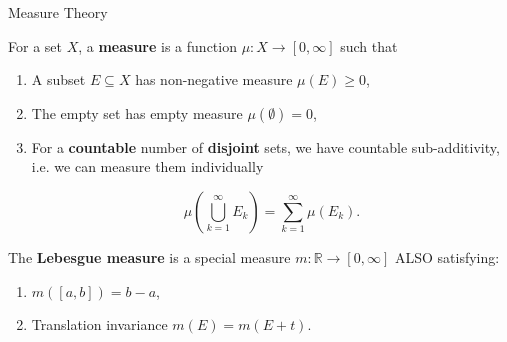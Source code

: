 \documentclass[9pt]{beamer}
\begin{document}
    \begin{frame}{Measure Theory}

        For a set $X$, a \textbf{measure} is a function $\mu:X\rightarrow[0, \infty]$ such that\pause

        \begin{enumerate}
            \item A subset $E\subseteq X$ has non-negative measure $\mu(E)\geq0$,\pause
            \item The empty set has empty measure $\mu(\emptyset)=0$,\pause
            \item For a \textbf{countable} number of \textbf{disjoint} sets, we have countable sub-additivity, i.e. we can measure them individually

            \[\mu\left(\bigcup_{k=1}^\infty E_k\right)=\sum_{k=1}^\infty \mu(E_k).\]
        \end{enumerate}

        \pause

        \vspace{24pt}

        The \textbf{Lebesgue measure} is a special measure $m:\mathbb{R}\rightarrow[0, \infty]$ ALSO satisfying:\pause

        \begin{enumerate}
            \item $m([a, b])=b-a$,\pause
            \item Translation invariance $m(E)=m(E+t)$.
        \end{enumerate}
        
    \end{frame}
\end{document}
